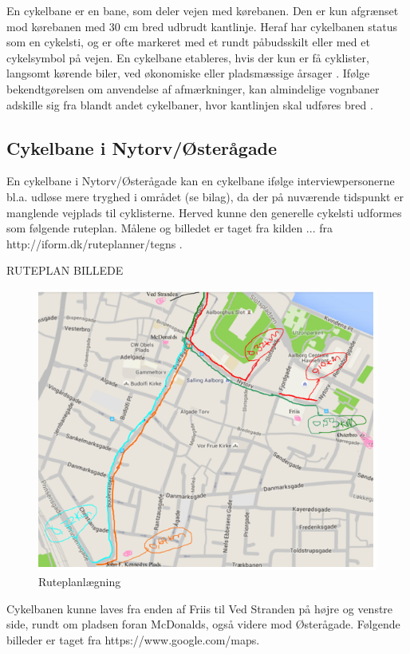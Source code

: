En cykelbane er en bane, som deler vejen med kørebanen. Den er kun afgrænset mod kørebanen med 30 cm bred udbrudt kantlinje. Heraf har cykelbanen status som en cykelsti, og er ofte markeret med et rundt påbudsskilt eller med et cykelsymbol på vejen. En cykelbane etableres, hvis der kun er få cyklister, langsomt kørende biler, ved økonomiske eller pladsmæssige årsager \autocite{vejdpdf}.   Ifølge bekendtgørelsen om anvendelse af afmærkninger, kan almindelige vognbaner adskille sig fra blandt andet cykelbaner, hvor kantlinjen skal udføres bred \autocite{lovb}.  

\subsection{Cykelbane i Nytorv/Østerågade}
En cykelbane i Nytorv/Østerågade kan en cykelbane ifølge interviewpersonerne bl.a. udløse mere tryghed i området (se bilag), da der på nuværende tidspunkt er manglende vejplads til cyklisterne. Herved kunne den generelle cykelsti udformes som følgende ruteplan. Målene og billedet er taget fra kilden ... fra http://iform.dk/ruteplanner/tegns .

RUTEPLAN BILLEDE
 \begin{figure}[htbp]
   \centering
   \begin{adjustbox}{max width=\textwidth}
     \includegraphics{figures/Billederogfigur/ruteplanlaegning.png}
  \end{adjustbox}
   \caption{Ruteplanlægning}
    \label{fig:ruteplan}
 \end{figure}
Cykelbanen kunne laves fra enden af Friis til Ved Stranden på højre og venstre side, rundt om pladsen foran McDonalds, også videre mod Østerågade. Følgende billeder er taget fra https://www.google.com/maps. 

